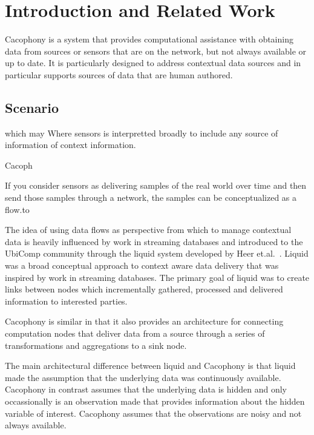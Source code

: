 \section{Introduction and Related Work}

Cacophony is a system that provides computational assistance with 
obtaining data from sources or sensors that are on the network, but not always
available or up to date.  It is particularly designed to address contextual data
sources and in particular supports sources of data that are human authored.







\subsection{Scenario}

which may Where sensors is
interpretted broadly to include any source of information of context
information.

Cacoph

If you consider sensors as delivering samples of the real world over time and
then send those samples through a network, the samples can be conceptualized as
a flow.to 


The idea of using data flows as perspective from which to manage contextual data
is heavily influenced by work in streaming databases and introduced to the
UbiComp community through the liquid system developed by Heer
et.al.~\cite{HeerNBH03}.  Liquid was a broad conceptual approach to context
aware data delivery that was inspired by work in streaming databases.  The
primary goal of liquid was to create links between nodes which incrementally
gathered, processed and delivered information to interested parties.

Cacophony is similar in that it also provides an architecture for connecting
computation nodes that deliver data from a source through a series of
transformations and aggregations to a sink node.

The main architectural difference between liquid and Cacophony is that liquid
made the assumption that the underlying data was continuously available.
Cacophony in contrast assumes that the underlying data is hidden and only
occassionally is an observation made that provides information about the hidden
variable of interest.  Cacophony assumes that the observations are noisy and not
always available.

